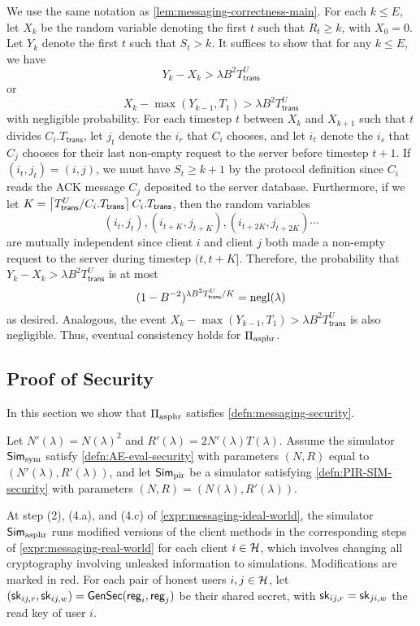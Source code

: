  We use the same notation as \cref{lem:messaging-correctness-main}. For each $k \leq E$, let $X_k$ be the random variable denoting the first $t$ such that $R_t \geq k$, with $X_0 = 0$. Let $Y_k$ denote the first $t$ such that $S_{t} > k$. It suffices to show that for any $k \leq E$, we have
 $$Y_k - X_k > \lambda B^2 T^U_{\mathsf{trans}}$$
 or
 $$X_{k} - \max(Y_{k - 1}, T_1) > \lambda B^2 T^U_{\mathsf{trans}}$$
 with negligible probability. For each timestep $t$ between $X_k$ and $X_{k + 1}$ such that $t$ divides $C_i.T_{\mathsf{trans}}$, let $j_t$ denote the $i_r$ that $C_i$ chooses, and let $i_t$ denote the $i_s$ that $C_j$ chooses for their last non-empty request to the server before timestep $t + 1$. If $(i_t, j_t) = (i, j)$, we must have $S_{t} \geq k + 1$ by the protocol definition since $C_i$ reads the ACK message $C_j$ deposited to the server database. Furthermore, if we let $K = \left\lceil T^U_{\mathsf{trans}} / C_i.T_{\mathsf{trans}} \right\rceil C_i.T_{\mathsf{trans}}$, then the random variables
 $$(i_t, j_t), (i_{t + K}, j_{t + K}), (i_{t + 2K}, j_{t + 2K})\cdots$$
are mutually independent since client $i$ and client $j$ both made a non-empty request to the server during timestep $(t, t + K]$. Therefore, the probability that $Y_k - X_k > \lambda B^2 T^U_{\mathsf{trans}}$ is at most
$$(1 - B^{-2})^{\lambda B^2 T^U_{\mathsf{trans}} / K} = \operatorname{negl}(\lambda)$$
as desired. Analogous, the event $X_{k} - \max(Y_{k - 1}, T_1) > \lambda B^2 T^U_{\mathsf{trans}}$ is also negligible. Thus, eventual consistency holds for $\Pi_{\text{asphr}}$.
\subsection{Proof of Security}
In this section we show that $\Pi_{\text{asphr}}$ satisfies \cref{defn:messaging-security}. 

Let $N'(\lambda) = N(\lambda)^2$ and $R'(\lambda) = 2N'(\lambda)T(\lambda)$. Assume the simulator $\mathsf{Sim}_{\text{sym}}$ satisfy \cref{defn:AE-eval-security} with parameters $(N, R)$ equal to $(N'(\lambda), R'(\lambda))$, and let $\mathsf{Sim}_{\text{pir}}$ be a simulator satisfying \cref{defn:PIR-SIM-security} with parameters $(N, R) = (N(\lambda), R'(\lambda))$. 

At step (2), (4.a), and (4.c) of \cref{expr:messaging-ideal-world}, the simulator $\mathsf{Sim}_{\text{asphr}}$ runs modified versions of the client methods in the corresponding steps of \cref{expr:messaging-real-world} for each client $i \in \mathcal{H}$, which involves changing all cryptography involving unleaked information to simulations. Modifications are marked in red. For each pair of honest users $i, j \in \mathcal{H}$, let $({\mathsf{sk}}_{ij, r}, {\mathsf{sk}}_{ij, w}) = \mathsf{GenSec}(\mathsf{reg}_i, \mathsf{reg}_j)$ be their shared secret, with ${\mathsf{sk}}_{ij, r} = {\mathsf{sk}}_{ji, w}$ the read key of user $i$.

